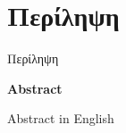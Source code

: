 \chapter*{Περίληψη}

\pagestyle{plain}

Περίληψη

\vspace{0.3cm}

\begin{flushleft}
\huge\textbf{Abstract}
\end{flushleft}

Abstract in English